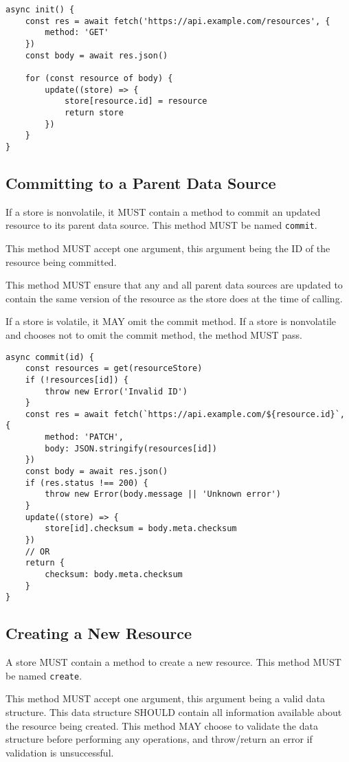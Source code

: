 \documentclass{article}
\begin{document}
\begin{lstlisting}[caption=Initialization Method]
async init() {
    const res = await fetch('https://api.example.com/resources', {
        method: 'GET'
    })
    const body = await res.json()
    
    for (const resource of body) {
        update((store) => {
            store[resource.id] = resource
            return store
        })
    }
}
\end{lstlisting}

\subsection{Committing to a Parent Data Source}
\label{commit}
If a store is nonvolatile, it MUST contain a method to commit an updated resource to its parent data source. This method MUST be named \verb|commit|. 

This method MUST accept one argument, this argument being the ID of the resource being committed.

This method MUST ensure that any and all parent data sources are updated to contain the same version of the resource as the store does at the time of calling.

If a store is volatile, it MAY omit the commit method. If a store is nonvolatile and chooses not to omit the commit method, the method MUST pass.

\begin{lstlisting}[caption=Commit Method]
async commit(id) {
    const resources = get(resourceStore)
    if (!resources[id]) {
        throw new Error('Invalid ID')
    }
    const res = await fetch(`https://api.example.com/${resource.id}`, {
        method: 'PATCH',
        body: JSON.stringify(resources[id])
    })
    const body = await res.json()
    if (res.status !== 200) {
        throw new Error(body.message || 'Unknown error')
    }
    update((store) => {
        store[id].checksum = body.meta.checksum
    })
    // OR
    return {
        checksum: body.meta.checksum
    }
}
\end{lstlisting}

\subsection{Creating a New Resource}
A store MUST contain a method to create a new resource. This method MUST be named \verb|create|.

This method MUST accept one argument, this argument being a valid data structure. This data structure SHOULD contain all information available about the resource being created. This method MAY choose to validate the data structure before performing any operations, and throw/return an error if validation is unsuccessful.
\end{document}
